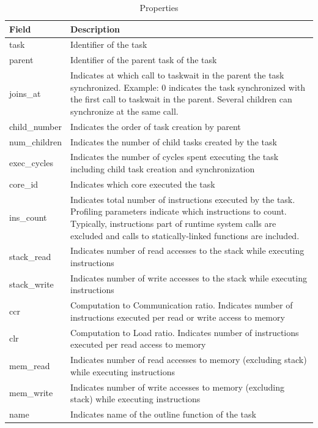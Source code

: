 \documentclass[11pt,a4paper,notitlepage]{article}
\begin{document}
\begin{table}[!htb]
\begin{tabular}{|p{2.5cm}|p{10cm}|}
\hline
\textbf{Field} & \textbf{Description} \\ \hline
task & Identifier of the task \\ \hline
parent & Identifier of the parent task of the task \\ \hline
joins\_at & Indicates at which call to taskwait in the parent the task synchronized. Example: 0 indicates the task synchronized with the first call to taskwait in the parent. Several children can synchronize at the same call.  \\ \hline
child\_number & Indicates the order of task creation by parent \\ \hline
num\_children & Indicates the number of child tasks created by the task \\ \hline
exec\_cycles & Indicates the number of cycles spent executing the task including child task creation and synchronization \\ \hline
core\_id & Indicates which core executed the task \\ \hline
ins\_count & Indicates total number of instructions executed by the task. Profiling parameters indicate which instructions to count. Typically, instructions part of runtime system calls are excluded and calls to statically-linked functions are included.  \\ \hline
stack\_read & Indicates number of read accesses to the stack while executing instructions  \\ \hline
stack\_write & Indicates number of write accesses to the stack while executing instructions \\ \hline
ccr & Computation to Communication ratio. Indicates number of instructions executed per read or write access to memory  \\ \hline
clr & Computation to Load ratio. Indicates number of instructions executed per read access to memory  \\ \hline
mem\_read & Indicates number of read accesses to memory (excluding stack) while executing instructions  \\ \hline
mem\_write & Indicates number of write accesses to memory (excluding stack) while executing instructions  \\ \hline
name & Indicates name of the outline function of the task \\ \hline
\end{tabular}
\caption{Properties}
\label{tab:properties}
\end{table}
\end{document}
